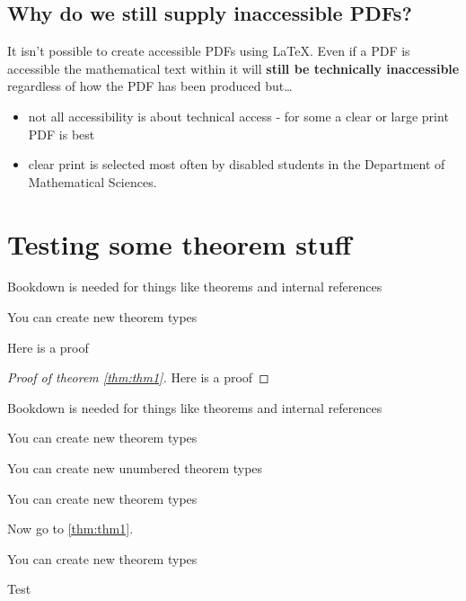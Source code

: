 \documentclass[12pt,english,a4paper]{extarticle}
\providecommand{\tightlist}{%
  \setlength{\itemsep}{0pt}\setlength{\parskip}{0pt}}
\theoremstyle{plain}
\theoremstyle{plain}
\theoremstyle{plain}
\theoremstyle{plain}
\theoremstyle{plain}
\theoremstyle{definition}
\theoremstyle{definition}
\theoremstyle{definition}
\theoremstyle{remark}
\theoremstyle{remark}
\let\BeginKnitrBlock\begin \let\EndKnitrBlock\end
\renewcommand{\;}{\,}
\begin{document}
\hypertarget{why-do-we-still-supply-inaccessible-pdfs}{%
\subsection{Why do we still supply inaccessible PDFs?}\label{why-do-we-still-supply-inaccessible-pdfs}}

It isn't possible to create accessible PDFs using LaTeX. Even if a PDF is accessible the mathematical text within it will \textbf{still be technically inaccessible} regardless of how the PDF has been produced but\ldots{}

\begin{itemize}
\tightlist
\item
  not all accessibility is about technical access - for some a clear or large print PDF is best
\item
  clear print is selected most often by disabled students in the Department of Mathematical Sciences.
\end{itemize}

\hypertarget{testing-some-theorem-stuff}{%
\section{Testing some theorem stuff}\label{testing-some-theorem-stuff}}

\BeginKnitrBlock{theorem}[Foo]
\label{thm:thm1} \iffalse (Foo) \fi{} Bookdown is needed for things like theorems and internal references
\EndKnitrBlock{theorem}

\BeginKnitrBlock{proposition}[Thingy we need for \ref{thm:thm1}]
\label{prp:prp1} \iffalse (Thingy we need for \ref{thm:thm1}) \fi{} You can create new theorem types
\EndKnitrBlock{proposition}

\BeginKnitrBlock{Proof}[Of theorem \ref{thm:thm1}]
\protect\hypertarget{Proof:unnamed-chunk-1}{}{\iffalse{} (\) \fi{}}Here is a proof
\EndKnitrBlock{Proof}

\BeginKnitrBlock{proof}[Proof of theorem \ref{thm:thm1}]
\iffalse{} {Proof (Proof of theorem \ref{thm:thm1}). } \fi{}Here is a proof
\EndKnitrBlock{proof}

\BeginKnitrBlock{proposition}
\label{prp:prp2} Bookdown is needed for things like theorems and internal references
\EndKnitrBlock{proposition}

\BeginKnitrBlock{Thought}[Bar]
\protect\hypertarget{Thought:tho1}{}{\iffalse{} \label{tho:tho1} \fi{}}You can create new theorem types
\EndKnitrBlock{Thought}

\BeginKnitrBlock{Wonder}
\protect\hypertarget{Wonder:unnamed-chunk-3}{}{\iffalse{} (\) \fi{}}You can create new unumbered theorem types
\EndKnitrBlock{Wonder}

\BeginKnitrBlock{Nugget}
\protect\hypertarget{Nugget:nug1}{}{\iffalse{} \label{nug:nug1} \fi{}}You can create new theorem types
\EndKnitrBlock{Nugget}

Now go to \ref{thm:thm1}.

\BeginKnitrBlock{Solution}
\protect\hypertarget{Solution:sol1}{}{\iffalse{} \label{sol:sol1} \fi{}}You can create new theorem types
\EndKnitrBlock{Solution}

\BeginKnitrBlock{solution}
\iffalse{} {Solution. } \fi{}Test
\EndKnitrBlock{solution}
\end{document}
